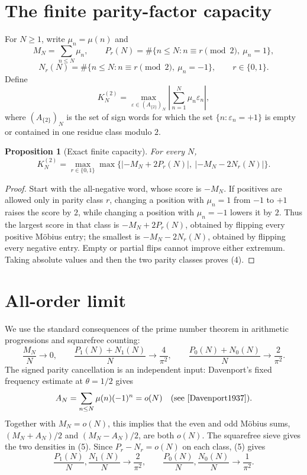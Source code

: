 \documentclass[11pt]{article}
\newtheorem{proposition}[theorem]{Proposition}
\newcommand{\Mob}{\mu}
\newcommand{\ParityFactor}{A_{\{2\}}}
\begin{document}
\section{The finite parity-factor capacity}

For $N\geq1$, write $\Mob_n=\Mob(n)$ and
\[
 M_N=\sum_{n\leq N}\Mob_n,
 \qquad
 P_r(N)=\#\{n\leq N:n\equiv r\pmod 2,\ \Mob_n=1\},
\]
\[
 N_r(N)=\#\{n\leq N:n\equiv r\pmod 2,\ \Mob_n=-1\},
 \qquad r\in\{0,1\}.
\]
Define
\[
 K_N^{(2)}=\max_{\varepsilon\in(\ParityFactor)_N}
 \left|\sum_{n=1}^N\Mob_n\varepsilon_n\right|,
 \tag{3}
\]
where \((\ParityFactor)_N\) is the set of sign words for which the set
\(\{n:\varepsilon_n=+1\}\) is empty or contained in one residue class
modulo $2$.

\begin{proposition}[Exact finite capacity]
\label{prop:finite}
For every $N$,
\[
 K_N^{(2)}=
 \max_{r\in\{0,1\}}
 \max\bigl\{|{-M_N+2P_r(N)}|,\ |{-M_N-2N_r(N)}|\bigr\}.
 \tag{4}
\]
\end{proposition}

\begin{proof}
Start with the all-negative word, whose score is $-M_N$.  If positives are
allowed only in parity class $r$, changing a position with $\Mob_n=1$ from
$-1$ to $+1$ raises the score by $2$, while changing a position with
$\Mob_n=-1$ lowers it by $2$.  Thus the largest score in that class is
$-M_N+2P_r(N)$, obtained by flipping every positive M\"obius entry; the
smallest is $-M_N-2N_r(N)$, obtained by flipping every negative entry.  Empty
or partial flips cannot improve either extremum.  Taking absolute values and
then the two parity classes proves (4).
\end{proof}

\section{All-order limit}

We use the standard consequences of the prime number theorem in arithmetic
progressions and squarefree counting:
\[
 \frac{M_N}{N}\to0,\qquad
 \frac{P_1(N)+N_1(N)}{N}\to\frac4{\pi^2},\qquad
 \frac{P_0(N)+N_0(N)}{N}\to\frac2{\pi^2}.
 \tag{5}
\]
The signed parity cancellation is an independent input: Davenport's fixed
frequency estimate at \(\theta=1/2\) gives
\[
 A_N=\sum_{n\le N}\Mob(n)(-1)^n=o(N)
 \quad\text{(see \cite{Davenport1937}).}
\]
Together with \(M_N=o(N)\), this implies that the even and odd M\"obius
sums, \((M_N+A_N)/2\) and \((M_N-A_N)/2\), are both $o(N)$.  The
squarefree sieve gives the two densities in (5).  Since
\(P_r-N_r=o(N)\) on each class, (5) gives
\[
 \frac{P_1(N)}N,\frac{N_1(N)}N\to\frac2{\pi^2},
 \qquad
 \frac{P_0(N)}N,\frac{N_0(N)}N\to\frac1{\pi^2}.
 \tag{6}
\]
\end{document}
